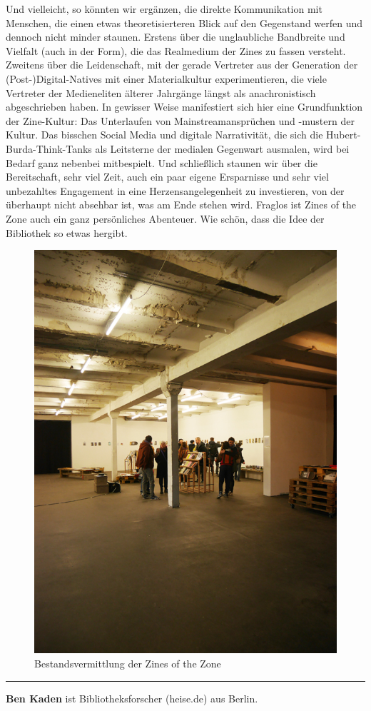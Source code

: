 \documentclass[a4paper,
fontsize=11pt,
oneside,
numbers=noperiodatend,
parskip=half-,
bibliography=totoc,
final
]{scrartcl}
\begin{document}
Und vielleicht, so könnten wir ergänzen, die direkte Kommunikation mit
Menschen, die einen etwas theoretisierteren Blick auf den Gegenstand
werfen und dennoch nicht minder staunen. Erstens über die unglaubliche
Bandbreite und Vielfalt (auch in der Form), die das Realmedium der Zines
zu fassen versteht. Zweitens über die Leidenschaft, mit der gerade
Vertreter aus der Generation der (Post-)Digital-Natives mit einer
Materialkultur experimentieren, die viele Vertreter der Medieneliten
älterer Jahrgänge längst als anachronistisch abgeschrieben haben. In
gewisser Weise manifestiert sich hier eine Grundfunktion der
Zine-Kultur: Das Unterlaufen von Mainstreamansprüchen und -mustern der
Kultur. Das bisschen Social Media und digitale Narrativität, die sich
die Hubert-Burda-Think-Tanks als Leitsterne der medialen Gegenwart
ausmalen, wird bei Bedarf ganz nebenbei mitbespielt. Und schließlich
staunen wir über die Bereitschaft, sehr viel Zeit, auch ein paar eigene
Ersparnisse und sehr viel unbezahltes Engagement in eine
Herzensangelegenheit zu investieren, von der überhaupt nicht absehbar
ist, was am Ende stehen wird. Fraglos ist Zines of the Zone auch ein
ganz persönliches Abenteuer. Wie schön, dass die Idee der Bibliothek so
etwas hergibt.

\begin{figure}[htbp]
\centering
\includegraphics{img/zinesofthezone.jpg}
\caption{Bestandsvermittlung der Zines of the Zone}
\end{figure}

\begin{center}\rule{0.5\linewidth}{\linethickness}\end{center}

\textbf{Ben Kaden} ist Bibliotheksforscher (heise.de) aus Berlin.

\end{document}
